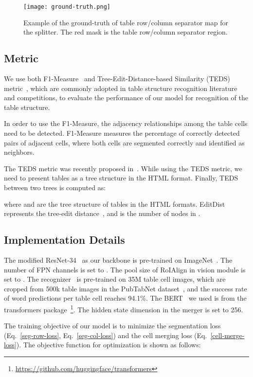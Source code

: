 \documentclass[review]{elsarticle}
\begin{document}
\begin{figure*}[htb]
	\centerline{\texttt{[image: ground-truth.png]}}
	\caption{Example of the ground-truth of table row/column separator map for the splitter. The red mask is the table row/column separator region.}
	\label{gt}
\end{figure*}

\subsection{Metric}
We use both F1-Measure~\cite{F1-Measure} and Tree-Edit-Distance-based Similarity (TEDS) metric~\cite{EDD}, which are commonly adopted in table structure recognition literature and competitions, to evaluate the performance of our model for recognition of the table structure.

In order to use the F1-Measure, the adjacency relationships among the table cells need to be detected. F1-Measure measures the percentage of correctly detected pairs of adjacent cells, where both cells are segmented correctly and identified as neighbors.

The TEDS metric was recently proposed in~\cite{EDD}. While using the TEDS metric, we need to present tables as a tree structure in the HTML format. Finally, TEDS between two trees is computed as:

where  and  are the tree structure of tables in the HTML formats. EditDist represents the tree-edit distance~\cite{TED}, and  is the number of nodes in .

\subsection{Implementation Details}
The modified ResNet-34~\cite{ResNet} as our backbone is pre-trained on ImageNet~\cite{ImageNet}. The number of FPN channels is set to . The pool size  of RoIAlign in vision module is set to . The recognizer~\cite{WAP} is pre-trained on 35M table cell images, which are cropped from 500k table images in the PubTabNet dataset~\cite{EDD}, and the success rate of word predictions per table cell reaches 94.1\%. The BERT~\cite{Bert} we used is from the transformers package~\footnote{\label{tranformer}\url{https://github.com/huggingface/transformers}}. The hidden state dimension in the merger is set to 256.

The training objective of our model is to minimize the segmentation loss (Eq.~\ref{seg-row-loss}, Eq.~\ref{seg-col-loss}) and the cell merging loss (Eq.~\ref{cell-merge-loss}). The objective function for optimization is shown as follows:
\end{document}
